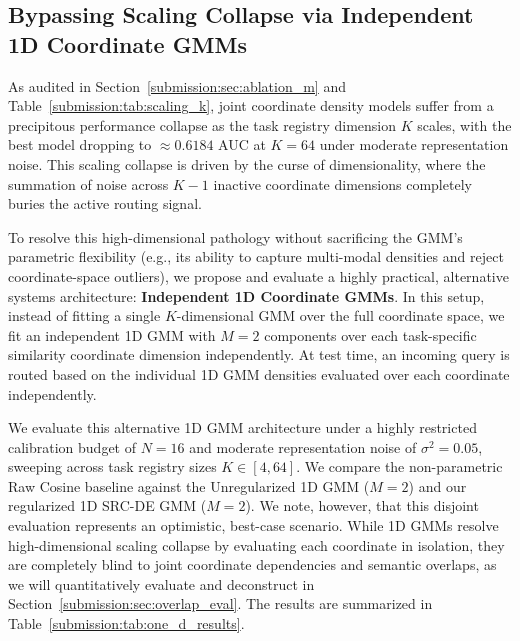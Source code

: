 \subsection{Bypassing Scaling Collapse via Independent 1D Coordinate GMMs}
\label{submission:sec:one_d_gmm}
As audited in Section~\ref{submission:sec:ablation_m} and Table~\ref{submission:tab:scaling_k}, joint coordinate density models suffer from a precipitous performance collapse as the task registry dimension $K$ scales, with the best model dropping to $\approx 0.6184$ AUC at $K=64$ under moderate representation noise. This scaling collapse is driven by the curse of dimensionality, where the summation of noise across $K-1$ inactive coordinate dimensions completely buries the active routing signal.

To resolve this high-dimensional pathology without sacrificing the GMM's parametric flexibility (e.g., its ability to capture multi-modal densities and reject coordinate-space outliers), we propose and evaluate a highly practical, alternative systems architecture: {\bf Independent 1D Coordinate GMMs}. In this setup, instead of fitting a single $K$-dimensional GMM over the full coordinate space, we fit an independent 1D GMM with $M=2$ components over each task-specific similarity coordinate dimension independently. At test time, an incoming query is routed based on the individual 1D GMM densities evaluated over each coordinate independently.

We evaluate this alternative 1D GMM architecture under a highly restricted calibration budget of $N=16$ and moderate representation noise of $\sigma^2 = 0.05$, sweeping across task registry sizes $K \in [4, 64]$. We compare the non-parametric Raw Cosine baseline against the Unregularized 1D GMM ($M=2$) and our regularized 1D SRC-DE GMM ($M=2$). We note, however, that this disjoint evaluation represents an optimistic, best-case scenario. While 1D GMMs resolve high-dimensional scaling collapse by evaluating each coordinate in isolation, they are completely blind to joint coordinate dependencies and semantic overlaps, as we will quantitatively evaluate and deconstruct in Section~\ref{submission:sec:overlap_eval}. The results are summarized in Table~\ref{submission:tab:one_d_results}.

